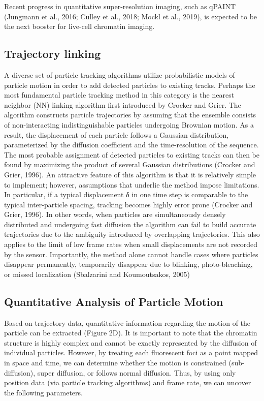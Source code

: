 Recent progress in quantitative super-resolution imaging, such as qPAINT (Jungmann et al., 2016; Culley et al., 2018; Mockl et al., 2019), is expected to be the next booster for live-cell chromatin imaging.

\subsection{Trajectory linking}

 A diverse set of particle tracking algorithms utilize
probabilistic models of particle motion in order to add detected particles to existing tracks.
Perhaps the most fundamental particle tracking method in this category is the nearest
neighbor (NN) linking algorithm first introduced by Crocker and Grier. The algorithm
constructs particle trajectories by assuming that the ensemble consists of non-interacting
indistinguishable particles undergoing Brownian motion. As a result, the displacement of
each particle follows a Gaussian distribution, parameterized by the diffusion coefficient and
the time-resolution of the sequence. The most probable assignment of detected particles
to existing tracks can then be found by maximizing the product of several Gaussian
distributions (Crocker and Grier, 1996). An attractive feature of this algorithm is that it is relatively simple to implement; however, assumptions that underlie the method impose
limitations. In particular, if a typical displacement δ in one time step is comparable to
the typical inter-particle spacing, tracking becomes highly error prone (Crocker and Grier,
1996). In other words, when particles are simultaneously densely distributed and undergoing
fast diffusion the algorithm can fail to build accurate trajectories due to the ambiguity
introduced by overlapping trajectories. This also applies to the limit of low frame rates when
small displacements are not recorded by the sensor. Importantly, the method alone cannot
handle cases where particles disappear permanently, temporarily disappear due to blinking,
photo-bleaching, or missed localization (Sbalzarini and Koumoutsakos, 2005)

\subsection{Quantitative Analysis of Particle Motion}

Based on trajectory data, quantitative information regarding the motion of the particle can be extracted (Figure 2D). It is important to note that the chromatin structure is highly complex and cannot be exactly represented by the diffusion of individual particles. However, by treating each fluorescent foci as a point mapped in space and time, we can determine whether the motion is constrained (sub-diffusion), super diffusion, or follows normal diffusion. Thus, by using only position data (via particle tracking algorithms) and frame rate, we can uncover the following parameters.

